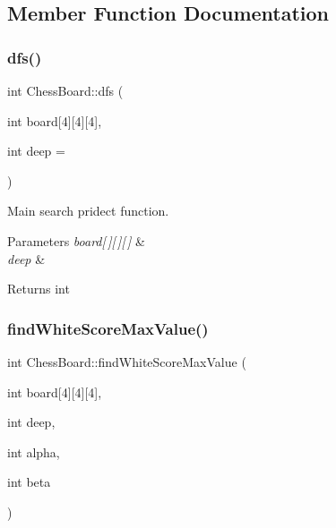 \subsection{Member Function Documentation}
\mbox{\label{class_chess_board_a3195308e0aecff2ad8b044b7118a5a4c}} 
\subsubsection{\texorpdfstring{dfs()}{dfs()}}
{\footnotesize\ttfamily int Chess\+Board\+::dfs (\begin{DoxyParamCaption}\item[{int}]{board\mbox{[}4\mbox{]}\mbox{[}4\mbox{]}\mbox{[}4\mbox{]},  }\item[{int}]{deep = {} }\end{DoxyParamCaption})}



Main search pridect function. 


\begin{DoxyParams}{Parameters}
{\em board\mbox{[}$\,$\mbox{]}\mbox{[}$\,$\mbox{]}\mbox{[}$\,$\mbox{]}} & \\
\hline
{\em deep} & \\
\hline
\end{DoxyParams}
\begin{DoxyReturn}{Returns}
int 
\end{DoxyReturn}
\mbox{\label{class_chess_board_af1577bee7c63bad019fdda023041ad96}} 
\subsubsection{\texorpdfstring{find\+White\+Score\+Max\+Value()}{findWhiteScoreMaxValue()}}
{\footnotesize\ttfamily int Chess\+Board\+::find\+White\+Score\+Max\+Value (\begin{DoxyParamCaption}\item[{int}]{board\mbox{[}4\mbox{]}\mbox{[}4\mbox{]}\mbox{[}4\mbox{]},  }\item[{int}]{deep,  }\item[{int}]{alpha,  }\item[{int}]{beta }\end{DoxyParamCaption})}



